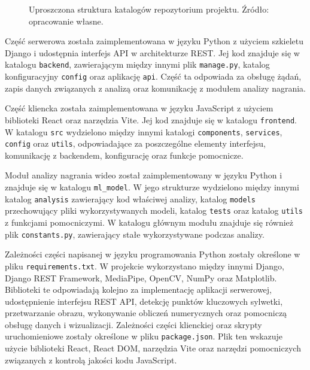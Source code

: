 \begin{figure}[H]
\centering
\begin{minipage}{0.85\textwidth}
\end{minipage}
\caption{Uproszczona struktura katalogów repozytorium projektu. Źródło: opracowanie własne.}
\label{fig:struktura-repozytorium}
\end{figure}


Część serwerowa została zaimplementowana w języku Python z użyciem szkieletu Django i udostępnia interfejs API w architekturze REST. Jej kod znajduje się w katalogu \texttt{backend}, zawierającym między innymi plik \texttt{manage.py}, katalog konfiguracyjny \texttt{config} oraz aplikację \texttt{api}. Część ta odpowiada za obsługę żądań, zapis danych związanych z analizą oraz komunikację z modułem analizy nagrania.

Część kliencka została zaimplementowana w języku JavaScript z użyciem biblioteki React oraz narzędzia Vite. Jej kod znajduje się w katalogu \texttt{frontend}. W katalogu \texttt{src} wydzielono między innymi katalogi \texttt{components}, \texttt{services}, \texttt{config} oraz \texttt{utils}, odpowiadające za poszczególne elementy interfejsu, komunikację z backendem, konfigurację oraz funkcje pomocnicze.

Moduł analizy nagrania wideo został zaimplementowany w języku Python i znajduje się w katalogu \texttt{ml\_model}. W jego strukturze wydzielono między innymi katalog \texttt{analysis} zawierający kod właściwej analizy, katalog \texttt{models} przechowujący pliki wykorzystywanych modeli, katalog \texttt{tests} oraz katalog \texttt{utils} z funkcjami pomocniczymi. W katalogu głównym modułu znajduje się również plik \texttt{constants.py}, zawierający stałe wykorzystywane podczas analizy.

Zależności części napisanej w języku programowania Python zostały określone w pliku \texttt{requirements.txt}. W projekcie wykorzystano między innymi Django, Django REST Framework, MediaPipe, OpenCV, NumPy oraz Matplotlib. Biblioteki te odpowiadają kolejno za implementację aplikacji serwerowej, udostępnienie interfejsu REST API, detekcję punktów kluczowych sylwetki, przetwarzanie obrazu, wykonywanie obliczeń numerycznych oraz pomocniczą obsługę danych i wizualizacji. Zależności części klienckiej oraz skrypty uruchomieniowe zostały określone w pliku \texttt{package.json}. Plik ten wskazuje użycie biblioteki React, React DOM, narzędzia Vite oraz narzędzi pomocniczych związanych z kontrolą jakości kodu JavaScript.

